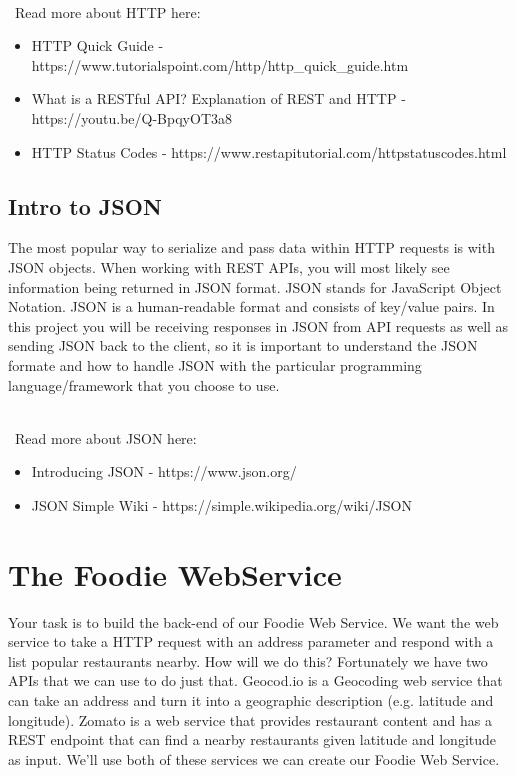 \documentclass{article}
\begin{document}
\-\\\ Read more about HTTP here:
\begin{itemize}
\item HTTP Quick Guide - https://www.tutorialspoint.com/http/http\_quick\_guide.htm
\item What is a RESTful API? Explanation of REST and HTTP - https://youtu.be/Q-BpqyOT3a8
\item HTTP Status Codes - https://www.restapitutorial.com/httpstatuscodes.html
\end{itemize}

\subsection*{Intro to JSON}
The most popular way to serialize and pass data within HTTP requests is with JSON objects. When working with REST APIs, you will most likely see information being returned in JSON format. JSON stands for JavaScript Object Notation. JSON is a human-readable format and consists of key/value pairs. In this project you will be receiving responses in JSON from API requests as well as sending JSON back to the client, so it is important to understand the JSON formate and how to handle JSON with the particular programming language/framework that you choose to use. 

\-\\\ Read more about JSON here:
\begin{itemize}
\item Introducing JSON - https://www.json.org/
\item JSON Simple Wiki - https://simple.wikipedia.org/wiki/JSON
\end{itemize}


\section*{The Foodie WebService}
Your task is to build the back-end of our Foodie Web Service. We want the web service to take a HTTP request with an address parameter and respond with a list popular restaurants nearby. How will we do this? Fortunately we have two APIs that we can use to do just that. Geocod.io is a Geocoding web service that can take an address and turn it into a geographic description (e.g. latitude and longitude). Zomato is a web service that provides restaurant content and has a REST endpoint that can find a nearby restaurants given latitude and longitude as input. We'll use both of these services we can create our Foodie Web Service.
\end{document}

